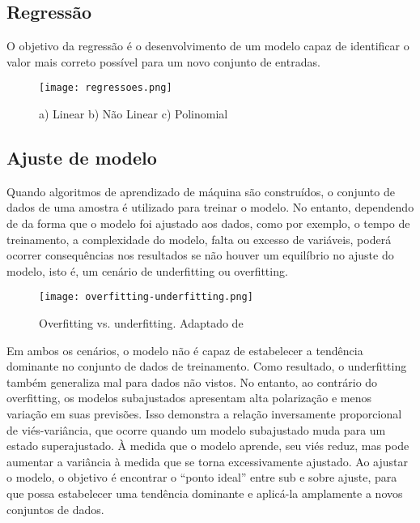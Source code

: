 \subsection{Regressão}\label{sec:LABEL_CHP_4_SEC_A_SUB_E}

 O objetivo da regressão é o desenvolvimento de um modelo capaz de identificar o valor mais correto possível para um novo conjunto de entradas.



\begin{figure}[ht]
    \centering
    \texttt{[image: regressoes.png]} 
    \caption{ a) Linear b) Não Linear c) Polinomial}
    \label{fig:regressoes}
\end{figure}
\FloatBarrier

\pagebreak
\subsection{Ajuste de modelo}\label{sec:LABEL_CHP_4_SEC_A_SUB_F}

Quando algoritmos de aprendizado de máquina são construídos, o conjunto de dados de uma amostra é utilizado para treinar o modelo. No entanto, dependendo de da forma que o modelo foi ajustado aos dados, como por exemplo, o tempo de treinamento, a complexidade do modelo, falta ou excesso de variáveis, poderá ocorrer consequências nos resultados se não houver um equilíbrio no ajuste do modelo, isto é, um cenário de underfitting ou overfitting.

\begin{figure}[ht]
    \centering
    \texttt{[image: overfitting-underfitting.png]} 
    \caption{Overfitting vs. underfitting. Adaptado de \cite{art:overfitting} }
    \label{fig:fitting-underfitting}
\end{figure}
\FloatBarrier

Em ambos os cenários, o modelo não é capaz de estabelecer a tendência dominante no conjunto de dados de treinamento. Como resultado, o underfitting também generaliza mal para dados não vistos. No entanto, ao contrário do overfitting, os modelos subajustados apresentam alta polarização e menos variação em suas previsões. Isso demonstra a relação inversamente proporcional de viés-variância, que ocorre quando um modelo subajustado muda para um estado superajustado. À medida que o modelo aprende, seu viés reduz, mas pode aumentar a variância à medida que se torna excessivamente ajustado. Ao ajustar o modelo, o objetivo é encontrar o ``ponto ideal'' entre sub e sobre ajuste, para que possa estabelecer uma tendência dominante e aplicá-la amplamente a novos conjuntos de dados.

